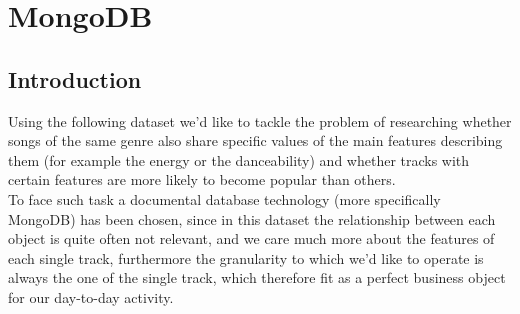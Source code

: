 
\chapter{MongoDB}
\label{ch:chapter_one}%

\section{Introduction}
Using the following dataset we'd like to tackle the problem of researching whether songs of the same genre also share specific values of the main features describing them (for example the energy or the danceability) and whether tracks with certain features are more likely to become popular than others.\\
To face such task a documental database technology (more specifically MongoDB) has been chosen, since in this dataset the relationship between each object is quite often not relevant, and we care much more about the features of each single track, furthermore the granularity to which we'd like to operate is always the one of the single track, which therefore fit as a perfect business object for our day-to-day activity.
\newpage

